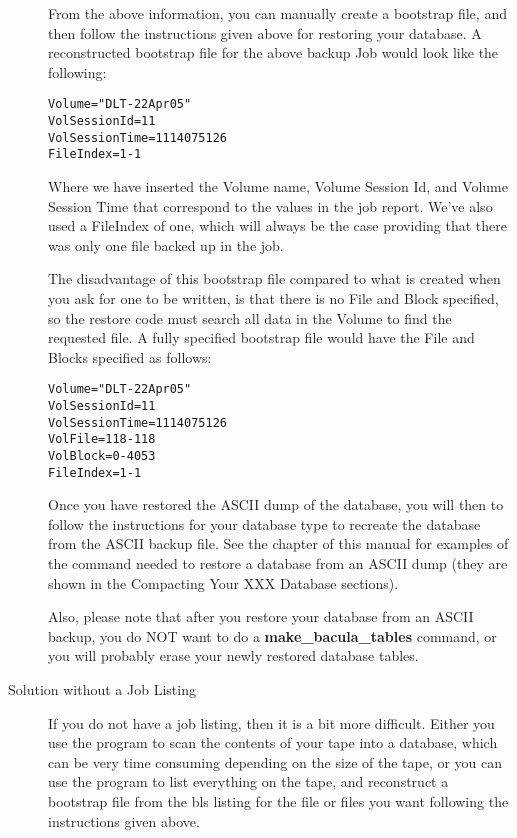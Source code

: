 \begin{description}
  From the above information, you can manually create a bootstrap file,
  and then follow the instructions given above for restoring your database.
  A reconstructed bootstrap file for the above backup Job would look
  like the following:

\footnotesize
\begin{verbatim}
Volume="DLT-22Apr05"
VolSessionId=11
VolSessionTime=1114075126
FileIndex=1-1
\end{verbatim}
\normalsize    

  Where we have inserted the Volume name, Volume Session Id, and Volume
  Session Time that correspond to the values in the job report.  We've also
  used a FileIndex of one, which will always be the case providing that
  there was only one file backed up in the job.
  
  The disadvantage of this bootstrap file compared to what is created when
  you ask for one to be written, is that there is no File and Block
  specified, so the restore code must search all data in the Volume to find
  the requested file.  A fully specified bootstrap file would have the File
  and Blocks specified as follows:

\footnotesize
\begin{verbatim}
Volume="DLT-22Apr05"
VolSessionId=11
VolSessionTime=1114075126
VolFile=118-118
VolBlock=0-4053
FileIndex=1-1
\end{verbatim}
\normalsize

   Once you have restored the ASCII dump of the database,
   you will then to follow the instructions for your
   database type to recreate the database from the ASCII backup file.
   See the  chapter of
   this manual for examples of the command needed to restore a 
   database from an ASCII dump (they are shown in the Compacting Your
   XXX Database sections).
    
   Also, please note that after you restore your database from an ASCII
   backup, you do NOT want to do a {\bf make\_bacula\_tables}  command, or
   you will probably erase your newly restored database tables.

\item [Solution without a Job Listing]
   If you do not have a job listing, then it is a bit more difficult.
   Either you use the  program to scan the contents
   of your tape into a database, which can be very time consuming 
   depending on the size of the tape, or you can use the 
   program to list everything on the tape, and reconstruct a bootstrap 
   file from the bls listing for the file or files you want following
   the instructions given above.


\end{description}
